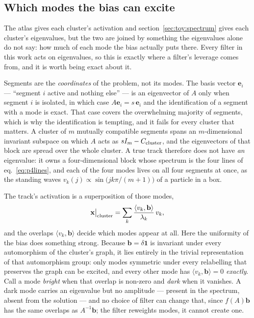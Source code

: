 \documentclass[11pt,a4paper]{article}
\begin{document}
\subsection{Which modes the bias can excite}
\label{sec:toy:modes}

The atlas gives each cluster's activation and section~\ref{sec:toy:spectrum}
gives each cluster's eigenvalues, but the two are joined by something the
eigenvalues alone do not say: how much of each mode the bias actually puts
there. Every filter in this work acts on eigenvalues, so this is exactly where
a filter's leverage comes from, and it is worth being exact about it.

Segments are the \emph{coordinates} of the problem, not its modes. The basis
vector $\mathbf{e}_i$ --- ``segment $i$ active and nothing else'' --- is an
eigenvector of $A$ only when segment $i$ is isolated, in which case
$A\mathbf{e}_i=s\,\mathbf{e}_i$ and the identification of a segment with a mode
is exact. That case covers the overwhelming majority of segments, which is why
the identification is tempting, and it fails for every cluster that matters. A
cluster of $m$ mutually compatible segments spans an $m$-dimensional invariant
subspace on which $A$ acts as $sI_m-C_{\rm cluster}$, and the eigenvectors of
that block are spread over the whole cluster. A true track therefore does not
have \emph{an} eigenvalue: it owns a four-dimensional block whose spectrum is
the four lines of eq.~\eqref{eq:p4lines}, and each of the four modes lives on
all four segments at once, as the standing waves
$v_k(j)\propto\sin\!\big(jk\pi/(m{+}1)\big)$ of a particle in a box.

The track's activation is a superposition of those modes,
\begin{equation}
\mathbf{x}\big|_{\rm cluster}
=\sum_{k}\frac{\langle v_k,\mathbf{b}\rangle}{\lambda_k}\,v_k ,
\label{eq:modesum}
\end{equation}
and the overlaps $\langle v_k,\mathbf{b}\rangle$ decide which modes appear at
all. Here the uniformity of the bias does something strong. Because
$\mathbf{b}=\delta\mathbf{1}$ is invariant under every automorphism of the
cluster's graph, it lies entirely in the trivial representation of that
automorphism group: only modes symmetric under every relabelling that preserves
the graph can be excited, and every other mode has
$\langle v_k,\mathbf{b}\rangle=0$ \emph{exactly}. Call a mode \emph{bright}
when that overlap is non-zero and \emph{dark} when it vanishes. A dark mode
carries an eigenvalue but no amplitude --- present in the spectrum, absent from
the solution --- and no choice of filter can change that, since $f(A)\mathbf{b}$
has the same overlaps as $A^{-1}\mathbf{b}$; the filter reweights modes, it
cannot create one.
\end{document}
